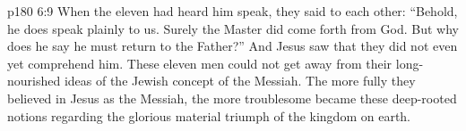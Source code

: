 \vs p180 6:9 When the eleven had heard him speak, they said to each other: “Behold, he does speak plainly to us. Surely the Master did come forth from God. But why does he say he must return to the Father?” And Jesus saw that they did not even yet comprehend him. These eleven men could not get away from their long\hyp{}nourished ideas of the Jewish concept of the Messiah. The more fully they believed in Jesus as the Messiah, the more troublesome became these deep\hyp{}rooted notions regarding the glorious material triumph of the kingdom on earth.
